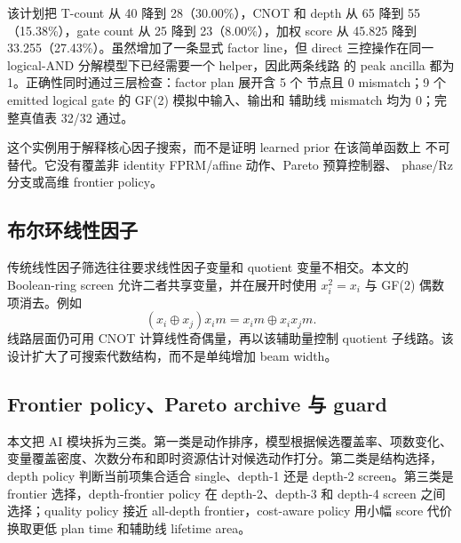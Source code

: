 \documentclass[UTF8,fontset=fandol,11pt]{ctexart}
\newcommand{\xor}{\ensuremath{\oplus}}
\begin{document}
\begin{table}[htbp]
\centering
\scriptsize
\setlength{\tabcolsep}{3pt}
\caption{具体实例的逻辑资源。Factor anc. 为显式复用因子线；peak ancilla
还包含分解 helper。Verified 为通过完整真值表检查的输入数。}
\label{tab:worked-example-resources-zh}
\resizebox{\linewidth}{!}{}
\end{table}

该计划把 T-count 从 40 降到 28（30.00\%），CNOT 和 depth 从 65 降到
55（15.38\%），gate count 从 25 降到 23（8.00\%），加权 score 从
45.825 降到 33.255（27.43\%）。虽然增加了一条显式 factor line，但 direct
三控操作在同一 logical-AND 分解模型下已经需要一个 helper，因此两条线路
的 peak ancilla 都为 1。正确性同时通过三层检查：factor plan 展开含 5 个
节点且 0 mismatch；9 个 emitted logical gate 的 GF(2) 模拟中输入、输出和
辅助线 mismatch 均为 0；完整真值表 32/32 通过。

这个实例用于解释核心因子搜索，而不是证明 learned prior 在该简单函数上
不可替代。它没有覆盖非 identity FPRM/affine 动作、Pareto 预算控制器、
phase/Rz 分支或高维 frontier policy。

\subsection{布尔环线性因子}

传统线性因子筛选往往要求线性因子变量和 quotient 变量不相交。本文的 Boolean-ring screen 允许二者共享变量，并在展开时使用 $x_i^2=x_i$ 与 GF(2) 偶数项消去。例如
\begin{equation}
  (x_i\xor x_j)x_i m = x_i m \xor x_i x_j m .
  \label{eq:boolean-ring}
\end{equation}
线路层面仍可用 CNOT 计算线性奇偶量，再以该辅助量控制 quotient 子线路。该设计扩大了可搜索代数结构，而不是单纯增加 beam width。

\subsection{Frontier policy、Pareto archive 与 guard}

本文把 AI 模块拆为三类。第一类是动作排序，模型根据候选覆盖率、项数变化、变量覆盖密度、次数分布和即时资源估计对候选动作打分。第二类是结构选择，depth policy 判断当前项集合适合 single、depth-1 还是 depth-2 screen。第三类是 frontier 选择，depth-frontier policy 在 depth-2、depth-3 和 depth-4 screen 之间选择；quality policy 接近 all-depth frontier，cost-aware policy 用小幅 score 代价换取更低 plan time 和辅助线 lifetime area。
\end{document}
